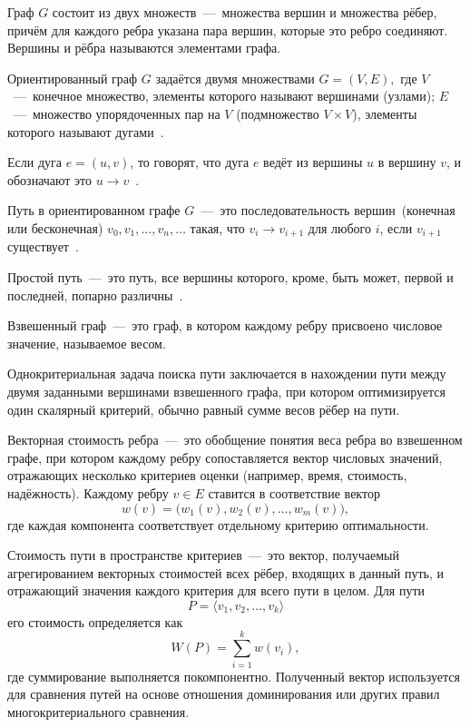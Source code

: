 Граф \(G\) состоит из двух множеств~---~множества вершин и множества рёбер, причём для каждого ребра указана пара вершин, которые это ребро соединяют. Вершины и рёбра называются элементами графа. 

Ориентированный граф \(G\) задаётся двумя множествами
\( G = (V, E), \)
где \(V\)~---~конечное множество, элементы которого называют вершинами (узлами); \(E\)~---~множество упорядоченных пар на \(V\) (подмножество \(V \times V\)), элементы которого называют дугами~\cite{belousov2025discrete}.

Если дуга \(e = (u, v)\), то говорят, что дуга \(e\) ведёт из вершины \(u\) в вершину \(v\), и обозначают это \(u \to v\)~\cite{belousov2025discrete}.

Путь в ориентированном графе \(G\)~---~это последовательность вершин~(конечная или бесконечная) \(
v_0, v_1, \ldots, v_n, \ldots\) такая, что \(v_i \to v_{i+1}\) для любого \(i\), если \(v_{i+1}\) существует~\cite{belousov2025discrete}.

Простой путь~---~это путь, все вершины которого, кроме, быть может, первой и последней, попарно различны~\cite{belousov2025discrete}.

Взвешенный граф~---~это граф, в котором каждому ребру присвоено числовое значение, называемое весом.

Однокритериальная задача поиска пути заключается в нахождении пути между двумя заданными вершинами взвешенного графа, при котором оптимизируется один скалярный критерий, обычно равный сумме весов рёбер на пути.

Векторная стоимость ребра~---~это обобщение понятия веса ребра во взвешенном графе, при котором каждому ребру сопоставляется вектор числовых значений, отражающих несколько критериев оценки (например, время, стоимость, надёжность). Каждому ребру
\(
v \in E
\)
ставится в соответствие вектор
\[
w(v) = \bigl(w_1(v), w_2(v), \ldots, w_m(v)\bigr),
\]
где каждая компонента соответствует отдельному критерию оптимальности.

Стоимость пути в пространстве критериев~---~это вектор, получаемый агрегированием векторных стоимостей всех рёбер, входящих в данный путь, и отражающий значения каждого критерия для всего пути в целом. Для пути
\[
P = \langle v_1, v_2, \ldots, v_k \rangle
\]
его стоимость определяется как
\[
W(P) = \sum_{i=1}^{k} w(v_i),
\]
где суммирование выполняется покомпонентно. Полученный вектор используется для сравнения путей на основе отношения доминирования или других правил многокритериального сравнения.

